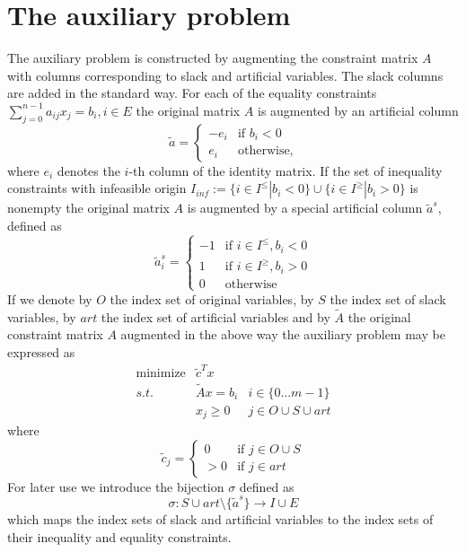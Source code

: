 \documentclass[a4paper]{article}
\begin{document}
\section{The auxiliary problem}
The auxiliary problem is constructed by augmenting the constraint matrix $A$
with columns corresponding to slack and artificial variables. The slack columns
are added in the standard way. For each of the equality constraints 
$\sum_{j=0}^{n-1} {a_{i j}x_{j}} = b_{i}, i \in E$ the original matrix $A$
is augmented by an artificial column
\begin{equation} \label{def:art_col}
 \tilde{a} =  \left\{
	        \begin{array}{ll}
  		  -e_{i} & \mbox{if $b_{i} < 0$} \\
		   e_{i}  & \mbox{otherwise,}
	        \end{array}
 	       \right.
\end{equation}
where $e_{i}$ denotes the $i$-th column of the identity matrix.
If the set of inequality constraints with infeasible origin
$I_{inf}:=\{i \in I^{\leq} \left| \right. b_{i} < 0 \} \cup 
  \{i \in I^{\geq} \left| \right. b_{i} > 0 \}$
 is nonempty the original matrix $A$
is augmented by a special artificial column $\tilde{a}^{s}$, defined as 
\begin{equation}\label{def:spec_art_col}
  \tilde{a}^{s}_{i} =  \left\{
	                 \begin{array}{ll}
  		           -1 & \mbox{if $i \in I^{\leq}, b_{i} < 0$} \\
		            1 & \mbox{if $i \in I^{\geq}, b_{i} > 0$} \\
		            0 & \mbox{otherwise}
	                 \end{array}
 	               \right.
\end{equation}
If we denote by $O$ the index set of original variables, by $S$ the index set
of slack variables, by $art$ the index set of artificial variables and by
$\tilde{A}$ the original constraint matrix $A$ augmented in the above way
the auxiliary problem may be expressed as
\begin{eqnarray*}
 \mbox{minimize} &  \tilde{c}^{T}x      & 	  \\
	s.t.	 & \tilde{A}x = b_{i}	& i \in \{0 \ldots m-1 \}      \\
		 & x_{j} \geq 0	  	& j \in O \cup S \cup art  
\end{eqnarray*}
where
\begin{equation} \label{def:aux_c}
 \tilde{c}_{j} =  \left\{
	            \begin{array}{ll}
  		      0      & \mbox{if $j \in O \cup S$} \\
		      > 0 & \mbox{if $j \in art$}
	            \end{array}
 	          \right.
\end{equation}
For later use we introduce the bijection $\sigma$ defined as
\begin{equation}
\sigma: S \cup art \setminus \{\tilde{a}^{s}\} \rightarrow I \cup E
\end{equation}
which maps the index sets of slack and artificial variables to
the index sets of their inequality and equality constraints.
 
\end{document}
